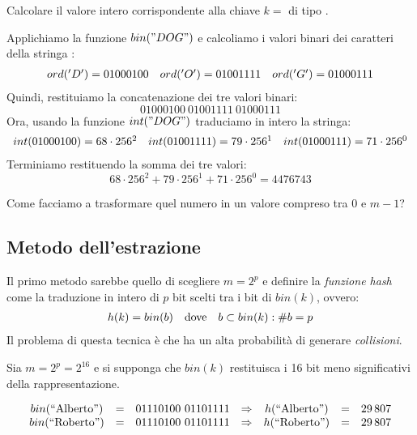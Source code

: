 \begin{eg}
    Calcolare il valore intero corrispondente alla chiave $k=$ di tipo
    \texttt{}.

    \bigskip\noindent
    Applichiamo la funzione $bin("DOG")$ e calcoliamo i valori
    binari dei caratteri della stringa :
    \[\begin{array}[t]{ccc}
        ord('D') = 01000100 & ord('O') = 01001111 &
        ord('G') = 01000111
    \end{array}\]
    Quindi, restituiamo la concatenazione dei tre valori binari:
    \[01000100\ 01001111\ 01000111\]
    Ora, usando la funzione $int("DOG")$ traduciamo in intero la stringa:
    \[\begin{array}[t]{ccc}
        int(01000100)=68\cdot256^2 &
        int(01001111)=79\cdot256^1 &
        int(01000111)=71\cdot256^0
    \end{array}\]
    Terminiamo restituendo la somma dei tre valori:
    \[68\cdot256^2+79\cdot256^1+71\cdot256^0=4476743\]
\end{eg}\noindent
Come facciamo a trasformare quel numero in un valore compreso tra $0$ e $m-1$?

\subsection{Metodo dell'estrazione}
Il primo metodo sarebbe quello di scegliere $m=2^p$ e definire la \emph{funzione
hash} come la traduzione in intero di $p$ bit scelti tra i bit di $bin(k)$,
ovvero:
\[\begin{array}[t]{lcr}
    h(k)=bin(b) & \text{dove} & b\subset bin(k):\#b=p
\end{array}\]
Il problema di questa tecnica è che ha un alta probabilità di generare
\emph{collisioni}.

\newpage
\begin{eg}
    Sia $m=2^p=2^{16}$ e si supponga che $bin(k)$ restituisca i 16 bit meno
    significativi della rappresentazione.

    \[\begin{array}[t]{ccccccc}
        bin(\text{``Alberto''}) & = & 01110100\ 01101111 & \Rightarrow &
        h(\text{``Alberto''}) & = & 29\,807\\
        bin(\text{``Roberto''}) & = & 01110100\ 01101111 & \Rightarrow &
        h(\text{``Roberto''}) & = & 29\,807
    \end{array}\]
\end{eg}

